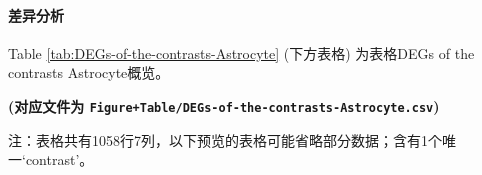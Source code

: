 \documentclass[
]{article}
\begin{document}
\hypertarget{ux5deeux5f02ux5206ux6790-1}{%
\paragraph{差异分析}\label{ux5deeux5f02ux5206ux6790-1}}

Table \ref{tab:DEGs-of-the-contrasts-Astrocyte} (下方表格) 为表格DEGs of the contrasts Astrocyte概览。

\textbf{(对应文件为 \texttt{Figure+Table/DEGs-of-the-contrasts-Astrocyte.csv})}

\begin{center}\begin{tcolorbox}[colback=gray!10, colframe=gray!50, width=0.9\linewidth, arc=1mm, boxrule=0.5pt]注：表格共有1058行7列，以下预览的表格可能省略部分数据；含有1个唯一`contrast'。
\end{tcolorbox}
\end{center}
\end{document}
